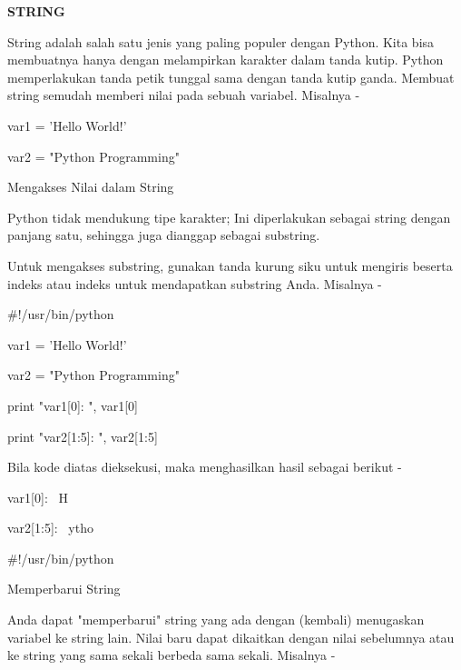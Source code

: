 \documentclass[a4paper,12pt]{report}
\begin{document}
\sloppy
\begin{center}\textbf{STRING}\end{center} \par
\noindent 
String adalah salah satu jenis yang paling populer dengan Python. Kita bisa membuatnya hanya dengan melampirkan karakter dalam tanda kutip. Python memperlakukan tanda petik tunggal sama dengan tanda kutip ganda. Membuat string semudah memberi nilai pada sebuah variabel. Misalnya - \par
\noindent 
\vspace{12pt}
\noindent 
var1 = 'Hello World!' \par
\noindent 
var2 = "Python Programming" \par
\noindent 
\vspace{12pt}
\noindent 
Mengakses Nilai dalam String \par
\noindent 
Python tidak mendukung tipe karakter; Ini diperlakukan sebagai string dengan panjang satu, sehingga juga dianggap sebagai substring. \par
\noindent 
Untuk mengakses substring, gunakan tanda kurung siku untuk mengiris beserta indeks atau indeks untuk mendapatkan substring Anda. Misalnya - \par
\noindent 
\vspace{12pt}
\noindent 
 $  \#  $!/usr/bin/python \par
\noindent 
\vspace{12pt}
\noindent 
var1 = 'Hello World!' \par
\noindent 
var2 = "Python Programming" \par
\noindent 
\vspace{12pt}
\noindent 
print "var1[0]: ", var1[0] \par
\noindent 
print "var2[1:5]: ", var2[1:5] \par
\vspace{12pt}
\noindent 
Bila kode diatas dieksekusi, maka menghasilkan hasil sebagai berikut - \par
\noindent 
\vspace{12pt}
\noindent 
var1[0]:~ H \par
\noindent 
var2[1:5]:~ ytho \par
\noindent 
\vspace{12pt}
\noindent 
 $  \#  $!/usr/bin/python \par
\noindent 
\vspace{12pt}
\noindent 
Memperbarui String \par
\noindent 
Anda dapat "memperbarui" string yang ada dengan (kembali) menugaskan variabel ke string lain. Nilai baru dapat dikaitkan dengan nilai sebelumnya atau ke string yang sama sekali berbeda sama sekali. Misalnya - \par
\end{document}
